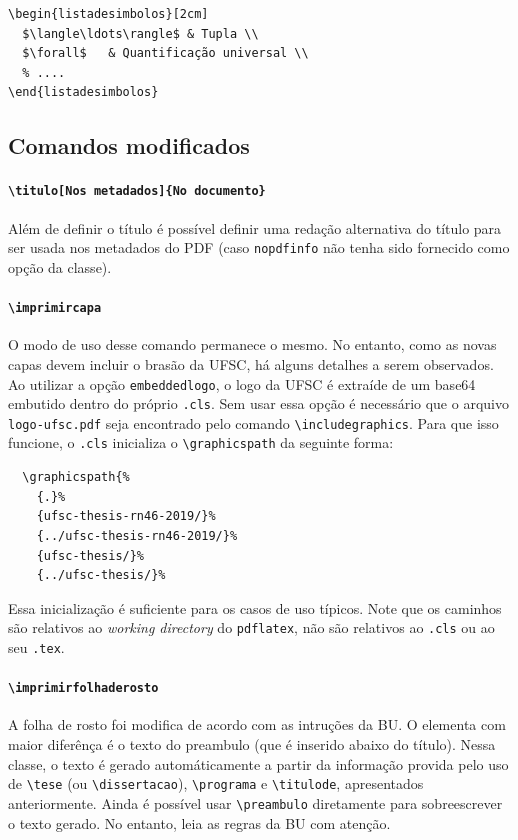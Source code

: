 \documentclass[embeddedlogo]{../ufsc-thesis-rn46-2019}
\newcommand{\lacmd}[1]{\texttt{\textbackslash{}#1}}
\begin{document}
\begin{verbatim}
\begin{listadesimbolos}[2cm]
  $\langle\ldots\rangle$ & Tupla \\
  $\forall$   & Quantificação universal \\
  % ....
\end{listadesimbolos}
\end{verbatim}

\subsection{Comandos \abnTeX{} modificados}

\paragraph*{\lacmd{titulo[Nos metadados]\{No documento\}}} Além de definir o título é
possível definir uma redação alternativa do título para ser usada nos metadados
do PDF (caso \texttt{nopdfinfo} não tenha sido fornecido como opção da classe).

\paragraph*{\lacmd{imprimircapa}} O modo de uso desse comando permanece o
mesmo. No entanto, como as novas capas devem incluir o brasão da UFSC, há alguns
detalhes a serem observados. Ao utilizar a opção \texttt{embeddedlogo}, o logo
da UFSC é extraíde de um base64 embutido dentro do próprio \texttt{.cls}. Sem
usar essa opção é necessário que o arquivo \texttt{logo-ufsc.pdf} seja
encontrado pelo comando \lacmd{includegraphics}. Para que isso funcione, o
\texttt{.cls} inicializa o \lacmd{graphicspath} da seguinte forma:

\begin{verbatim}
  \graphicspath{%
    {.}%
    {ufsc-thesis-rn46-2019/}%
    {../ufsc-thesis-rn46-2019/}%
    {ufsc-thesis/}%
    {../ufsc-thesis/}%
\end{verbatim}

Essa inicialização é suficiente para os casos de uso típicos. Note que os
caminhos são relativos ao \emph{working directory} do \texttt{pdflatex}, não são
relativos ao \texttt{.cls} ou ao seu \texttt{.tex}.

\paragraph*{\lacmd{imprimirfolhaderosto}} A folha de rosto foi modifica de
acordo com as intruções da BU. O elementa com maior diferênça é o texto do
preambulo (que é inserido abaixo do título). Nessa classe, o texto é gerado
automáticamente a partir da informação provida pelo uso de \lacmd{tese} (ou
\lacmd{dissertacao}), \lacmd{programa} e \lacmd{titulode}, apresentados
anteriormente. Ainda é possível usar \lacmd{preambulo} diretamente para
sobreescrever o texto gerado. No entanto, leia as regras da BU com atenção.
\end{document}
